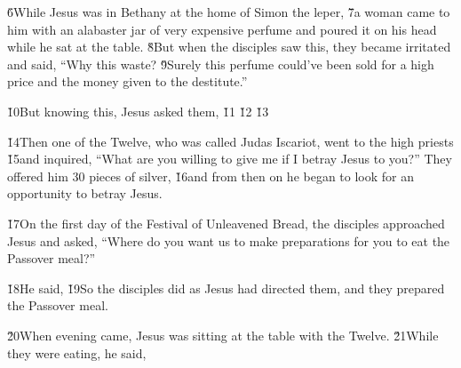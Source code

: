\v{6}While Jesus was in Bethany at the home of Simon the leper, \v{7}a woman came to him with an alabaster jar of very expensive perfume and poured it on his head while he sat at the table. \v{8}But when the disciples saw this, they became irritated and said, ``Why this waste? \v{9}Surely this perfume could've been sold for a high price and the money given to the destitute.''

\v{10}But knowing this, Jesus asked them,  \v{11} \v{12} \v{13}

\v{14}Then one of the Twelve, who was called Judas Iscariot, went to the high priests \v{15}and inquired, ``What are you willing to give me if I betray Jesus to you?'' They offered him 30 pieces of silver, \v{16}and from then on he began to look for an opportunity to betray Jesus.

\v{17}On the first day of the Festival of Unleavened Bread, the disciples approached Jesus and asked, ``Where do you want us to make preparations for you to eat the Passover meal?''

\v{18}He said,  \v{19}So the disciples did as Jesus had directed them, and they prepared the Passover meal.

\v{20}When evening came, Jesus was sitting at the table with the Twelve. \v{21}While they were eating, he said, 

